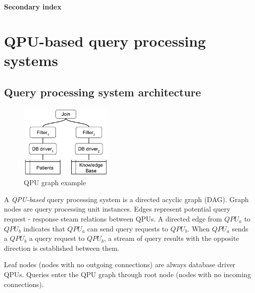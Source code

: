 \bigskip
\noindent
\textbf{Secondary index}


\section{QPU-based query processing systems}
\label{sec:query_processing_system}

\subsection{Query processing system architecture}

\begin{figure}[t]
  \centering
    \includegraphics[width=0.4\textwidth]{./figures/design_pattern/qpu_graph_emergent_properties.pdf}
  \caption{QPU graph example}
  \label{fig:qpu_graph_emergent_properties}
\end{figure}

A \textit{QPU-based} query processing system is a directed acyclic graph (DAG).
Graph nodes are query processing unit instances.
Edges represent potential query request - response steam relations between QPUs.
A directed edge from $QPU_a$ to $QPU_b$ indicates that $QPU_a$ can send query requests to $QPU_b$.
When $QPU_a$ sends a $QPU_b$ a query request to $QPU_b$, a stream of query results with the opposite direction is established between them.

Leaf nodes (nodes with no outgoing connections) are always database driver QPUs.
Queries enter the QPU graph through root node (nodes with no incoming connections).

